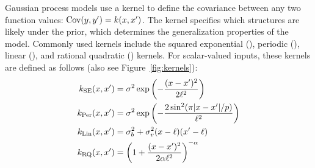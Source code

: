 \documentclass[twoside]{article}
\begin{document}
Gaussian process models use a kernel to define the covariance between any two function values: ${\textrm{Cov}(y, y') = k(x,x')}$.
The kernel specifies which structures are likely under the \gp{} prior, which determines the generalization properties of the model.
%
%
Commonly used kernels include the squared exponential (\kSE), periodic (\kPer), linear (\kLin), and rational quadratic (\kRQ) kernels. 
For scalar-valued inputs, these kernels are defined as follows (also see Figure~\ref{fig:kernels}):
\begin{align}
k_\textrm{SE}(x, x') &= \sigma^2\exp\left(-\frac{(x - x')^2}{2\ell^2}\right) \\
k_\textrm{Per}(x, x') &= \sigma^2\exp\left(-\frac{2\sin^2(\pi|x - x'|/p)}{\ell^2}\right) \\
k_\textrm{Lin}(x, x') &= \sigma_b^2 + \sigma_v^2(x - \ell)(x' - \ell) \\
k_\textrm{RQ}(x, x') &= \left( 1 + \frac{(x - x')^2}{2 \alpha \ell^2} \right)^{-\alpha}
\end{align}

\end{document}
